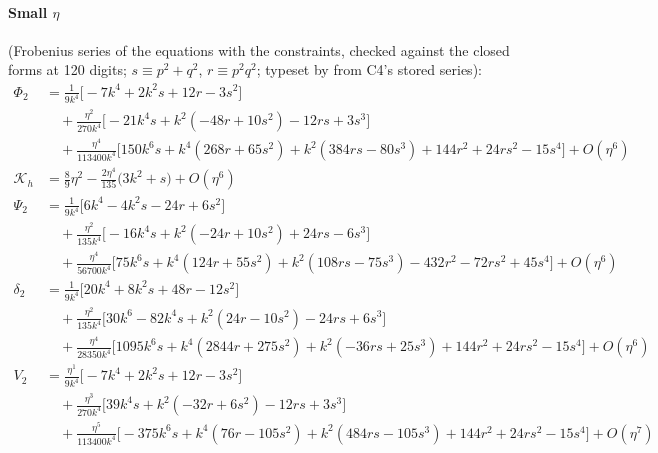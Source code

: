 {\paragraph{Small $\eta$} (Frobenius series of the equations with the constraints, checked against the closed forms at 120 digits;
$s\equiv p^2+q^2$, $r\equiv p^2q^2$; typeset by  from C4's stored series):
\begin{align*}
\Phi_2&=\frac{1}{9 k^{4}}\Big[- 7 k^{4} + 2 k^{2} s + 12 r - 3 s^{2}\Big]\\
&\quad+\frac{\eta^{2}}{270 k^{4}}\Big[- 21 k^{4} s + k^{2} \left(- 48 r + 10 s^{2}\right) - 12 r s + 3 s^{3}\Big]\\
&\quad+\frac{\eta^{4}}{113400 k^{4}}\Big[150 k^{6} s + k^{4} \left(268 r + 65 s^{2}\right) + k^{2} \left(384 r s - 80 s^{3}\right) + 144 r^{2} + 24 r s^{2} - 15 s^{4}\Big]+O(\eta^{6})\\
\mathcal K_h&=\frac89\eta^2-\frac{2\eta^4}{135}\big(3k^2+s\big)+O(\eta^{6})\\
\Psi_2&=\frac{1}{9 k^{4}}\Big[6 k^{4} - 4 k^{2} s - 24 r + 6 s^{2}\Big]\\
&\quad+\frac{\eta^{2}}{135 k^{4}}\Big[- 16 k^{4} s + k^{2} \left(- 24 r + 10 s^{2}\right) + 24 r s - 6 s^{3}\Big]\\
&\quad+\frac{\eta^{4}}{56700 k^{4}}\Big[75 k^{6} s + k^{4} \left(124 r + 55 s^{2}\right) + k^{2} \left(108 r s - 75 s^{3}\right) - 432 r^{2} - 72 r s^{2} + 45 s^{4}\Big]+O(\eta^{6})\\
\delta_2&=\frac{1}{9 k^{4}}\Big[20 k^{4} + 8 k^{2} s + 48 r - 12 s^{2}\Big]\\
&\quad+\frac{\eta^{2}}{135 k^{4}}\Big[30 k^{6} - 82 k^{4} s + k^{2} \left(24 r - 10 s^{2}\right) - 24 r s + 6 s^{3}\Big]\\
&\quad+\frac{\eta^{4}}{28350 k^{4}}\Big[1095 k^{6} s + k^{4} \left(2844 r + 275 s^{2}\right) + k^{2} \left(- 36 r s + 25 s^{3}\right) + 144 r^{2} + 24 r s^{2} - 15 s^{4}\Big]+O(\eta^{6})\\
V_2&=\frac{\eta^{1}}{9 k^{4}}\Big[- 7 k^{4} + 2 k^{2} s + 12 r - 3 s^{2}\Big]\\
&\quad+\frac{\eta^{3}}{270 k^{4}}\Big[39 k^{4} s + k^{2} \left(- 32 r + 6 s^{2}\right) - 12 r s + 3 s^{3}\Big]\\
&\quad+\frac{\eta^{5}}{113400 k^{4}}\Big[- 375 k^{6} s + k^{4} \left(76 r - 105 s^{2}\right) + k^{2} \left(484 r s - 105 s^{3}\right) + 144 r^{2} + 24 r s^{2} - 15 s^{4}\Big]+O(\eta^{7})
\end{align*}
}
